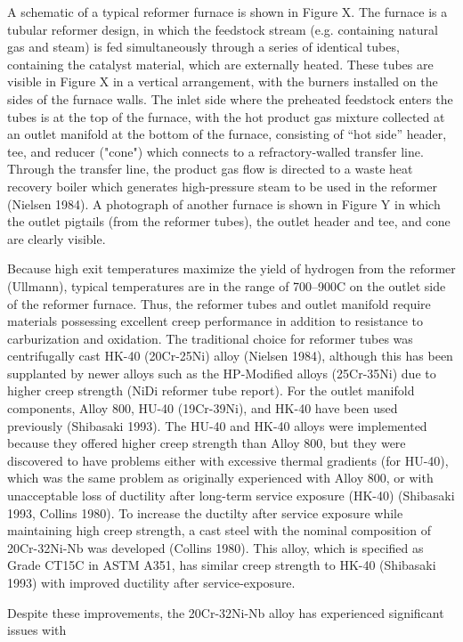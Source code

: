 A schematic of a typical reformer furnace is shown in Figure X. The furnace is a tubular reformer design, in which the feedstock stream (e.g. containing natural gas and steam) is fed simultaneously through a series of identical tubes, containing the catalyst material, which are externally heated. These tubes are visible in Figure X in a vertical arrangement, with the burners installed on the sides of the furnace walls. The inlet side where the preheated feedstock enters the tubes is at the top of the furnace, with the hot product gas mixture collected at an outlet manifold at the bottom of the furnace, consisting of ``hot side'' header, tee, and reducer ("cone") which connects to a refractory-walled transfer line. Through the transfer line, the product gas flow is directed to a waste heat recovery boiler which generates high-pressure steam to be used in the reformer (Nielsen 1984). A photograph of another furnace is shown in Figure Y in which the outlet pigtails (from the reformer tubes), the outlet header and tee, and cone are clearly visible.

Because high exit temperatures maximize the yield of hydrogen from the reformer (Ullmann), typical temperatures are in the range of 700--900C on the outlet side of the reformer furnace. Thus, the reformer tubes and outlet manifold require materials possessing excellent creep performance in addition to resistance to carburization and oxidation. The traditional choice for reformer tubes was centrifugally cast HK-40 (20Cr-25Ni) alloy  (Nielsen 1984), although this has been supplanted by newer alloys such as the HP-Modified alloys (25Cr-35Ni) due to higher creep strength (NiDi reformer tube report). For the outlet manifold components, Alloy 800, HU-40 (19Cr-39Ni), and HK-40 have been used previously (Shibasaki 1993). The HU-40 and HK-40 alloys were implemented because they offered higher creep strength than Alloy 800, but they were discovered to have problems either with excessive thermal gradients (for HU-40), which was the same problem as originally experienced with Alloy 800, or with unacceptable loss of ductility after long-term service exposure (HK-40) (Shibasaki 1993, Collins 1980). To increase the ductilty after service exposure while maintaining high creep strength, a cast steel with the nominal composition of 20Cr-32Ni-Nb was developed (Collins 1980). This alloy, which is specified as Grade CT15C in ASTM A351, has similar creep strength to HK-40 (Shibasaki 1993) with improved ductility after service-exposure. 

Despite these improvements, the 20Cr-32Ni-Nb alloy has experienced significant issues with 




